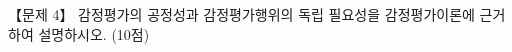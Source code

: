 \begin{longquestion}{【문제 4】}
감정평가의 공정성과 감정평가행위의 독립 필요성을 감정평가이론에 근거하여 설명하시오. (10점) \par
\end{longquestion}
